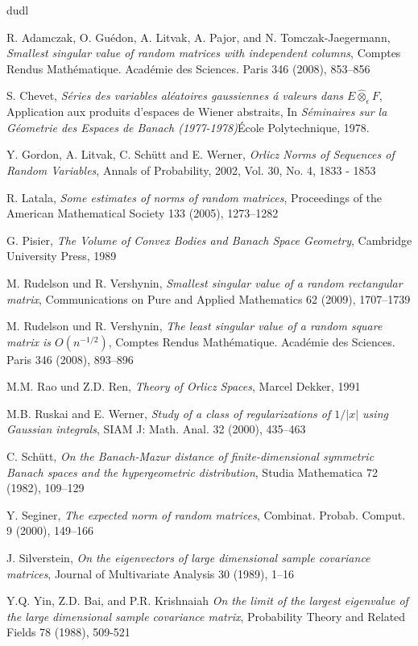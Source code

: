 \documentclass[12pt,a4paper]{article}
\begin{document}
\begin{thebibliography}{dudl}



{\sc R.  Adamczak, O. Gu{\'e}don, A. Litvak,
A. Pajor,  and N. Tomczak-Jaegermann},
{\em Smallest singular value of random matrices with  
independent columns},
Comptes Rendus Math\'ematique. Acad\'emie des Sciences.  
Paris 346 (2008), 853--856


{\sc S. Chevet},
{\em S\'eries des variables al\'eatoires gaussiennes \'a valeurs 
dans $E\hat\otimes_{\epsilon}F$},
Application aux produits d'espaces de Wiener abstraits,
In 
{\it S\'eminaires sur la G\'eometrie des Espaces de Banach
(1977-1978)}\'Ecole Polytechnique, 1978.


{\sc Y. Gordon, A. Litvak, C. Sch\"utt and E. Werner}, 
{\em Orlicz Norms of Sequences of Random Variables}, 
 Annals of Probability, 2002, Vol. 30, No. 4, 1833 - 1853
 
 {\sc R. Latala},
 {\em Some estimates of norms of random matrices},
 Proceedings of the American Mathematical Society
 133 (2005), 1273--1282
 
 {\sc G. Pisier},
 {\em The Volume of Convex Bodies and Banach Space Geometry},
 Cambridge University Press, 1989
 
 {\sc M. Rudelson und R. Vershynin},
 {\em Smallest singular value of a random rectangular matrix},
 Communications on Pure and Applied Mathematics 62 (2009),
 1707--1739

 {\sc M. Rudelson und R. Vershynin},
{\em The least singular value of a random square matrix is  
{$O(n^{-1/2})$}},
Comptes Rendus Math\'ematique. Acad\'emie des Sciences.  
Paris 346 (2008), 893--896


{\sc M.M. Rao und Z.D. Ren},
{\em Theory of Orlicz Spaces},
Marcel Dekker, 1991


{\sc M.B. Ruskai and E. Werner},
{\em Study of a class of regularizations of $1/|x|$ using Gaussian
integrals},
SIAM J: Math. Anal. 32 (2000), 435--463


{\sc C. Sch\"utt},
{\em On the Banach-Mazur distance of finite-dimensional symmetric Banach spaces and the hypergeometric distribution},
Studia Mathematica 72 (1982), 109--129


{\sc Y. Seginer},
{\em The expected norm of random matrices},
Combinat. Probab. Comput. 9 (2000), 149--166

{\sc J. Silverstein},
{\em On the eigenvectors of large dimensional
sample covariance matrices},
Journal of Multivariate Analysis 30 (1989), 1--16

{\sc Y.Q. Yin, Z.D. Bai, and P.R. Krishnaiah}
{\em On the limit of the largest eigenvalue of the
large dimensional sample covariance matrix},
Probability Theory and Related Fields 78 (1988), 509-521

\end{thebibliography}
\end{document}
